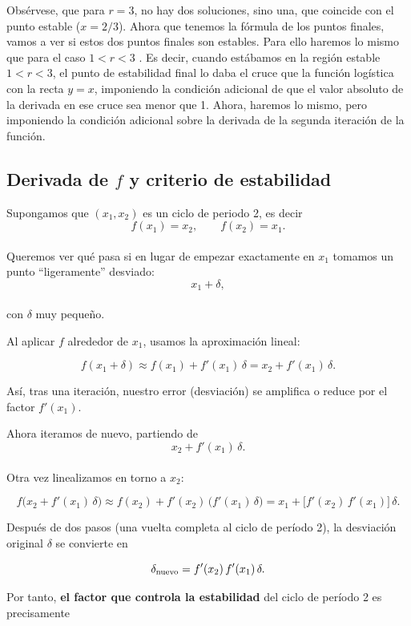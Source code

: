 \documentclass[
  11pt,
  a4paper,
  DIV=11,
  numbers=noendperiod]{scrreprt}
\begin{document}
Obsérvese, que para \(r=3\), no hay dos soluciones, sino una, que
coincide con el punto estable (\(x=2/3\)). Ahora que tenemos la fórmula
de los puntos finales, vamos a ver si estos dos puntos finales son
estables. Para ello haremos lo mismo que para el caso \(1<r<3\) . Es
decir, cuando estábamos en la región estable \(1<r<3\), el punto de
estabilidad final lo daba el cruce que la función logística con la recta
\(y=x\), imponiendo la condición adicional de que el valor absoluto de
la derivada en ese cruce sea menor que 1. Ahora, haremos lo mismo, pero
imponiendo la condición adicional sobre la derivada de la segunda
iteración de la función.

\subsection{\texorpdfstring{Derivada de \(f\) y criterio de
estabilidad}{Derivada de f y criterio de estabilidad}}\label{derivada-de-f-y-criterio-de-estabilidad}

Supongamos que \((x_1,x_2)\) es un ciclo de periodo 2, es decir\\
\[
f(x_1)=x_2,\qquad f(x_2)=x_1.
\]\\
Queremos ver qué pasa si en lugar de empezar exactamente en \(x_1\)
tomamos un punto ``ligeramente'' desviado:\\
\[
x_1 + \delta,
\]\\
con \(\delta\) muy pequeño.

Al aplicar \(f\) alrededor de \(x_1\), usamos la aproximación lineal:

\[
f(x_1 + \delta)
\approx f(x_1) + f'(x_1)\,\delta
= x_2 + f'(x_1)\,\delta.
\]

Así, tras una iteración, nuestro error (desviación) se amplifica o
reduce por el factor \(f'(x_1)\).

Ahora iteramos de nuevo, partiendo de\\
\[
x_2 + f'(x_1)\,\delta.
\]\\
Otra vez linealizamos en torno a \(x_2\):

\[
f\bigl(x_2 + f'(x_1)\,\delta\bigr)
\approx f(x_2) + f'(x_2)\,\bigl(f'(x_1)\,\delta\bigr)
= x_1 + \bigl[f'(x_2)\,f'(x_1)\bigr]\,\delta.
\]

Después de dos pasos (una vuelta completa al ciclo de período 2), la
desviación original \(\delta\) se convierte en

\[
\delta_{\rm nuevo} = f'(x_2)\,f'(x_1)\,\delta.
\]

Por tanto, \textbf{el factor que controla la estabilidad} del ciclo de
período 2 es precisamente
\end{document}
